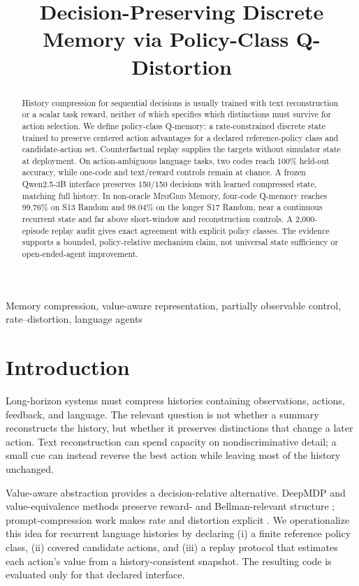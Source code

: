 \documentclass{article}
\title{Decision-Preserving Discrete Memory via Policy-Class Q-Distortion}
\def\minigrid{\textsc{MiniGrid}}
\def\qwen{Qwen2.5}
\begin{document}
\ninept
\maketitle

\begin{abstract}
History compression for sequential decisions is usually trained with text reconstruction or a scalar task reward, neither of which specifies which distinctions must survive for action selection. We define policy-class Q-memory: a rate-constrained discrete state trained to preserve centered action advantages for a declared reference-policy class and candidate-action set. Counterfactual replay supplies the targets without simulator state at deployment. On action-ambiguous language tasks, two codes reach 100\% held-out accuracy, while one-code and text/reward controls remain at chance. A frozen \qwen-3B interface preserves 150/150 decisions with learned compressed state, matching full history. In non-oracle \minigrid{} Memory, four-code Q-memory reaches 99.76\% on S13 Random and 98.04\% on the longer S17 Random, near a continuous recurrent state and far above short-window and reconstruction controls. A 2,000-episode replay audit gives exact agreement with explicit policy classes. The evidence supports a bounded, policy-relative mechanism claim, not universal state sufficiency or open-ended-agent improvement.
\end{abstract}
\begin{keywords}
Memory compression, value-aware representation, partially observable control, rate--distortion, language agents
\end{keywords}

\section{Introduction}
Long-horizon systems must compress histories containing observations, actions, feedback, and language. The relevant question is not whether a summary reconstructs the history, but whether it preserves distinctions that change a later action. Text reconstruction can spend capacity on nondiscriminative detail; a small cue can instead reverse the best action while leaving most of the history unchanged.

Value-aware abstraction provides a decision-relative alternative. DeepMDP and value-equivalence methods preserve reward- and Bellman-relevant structure \cite{gelada2019deepmdp,grimm2020value}; prompt-compression work makes rate and distortion explicit \cite{zhu2025turbo,nagle2024limits}. We operationalize this idea for recurrent language histories by declaring (i) a finite reference policy class, (ii) covered candidate actions, and (iii) a replay protocol that estimates each action's value from a history-consistent snapshot. The resulting code is evaluated only for that declared interface.
\end{document}
